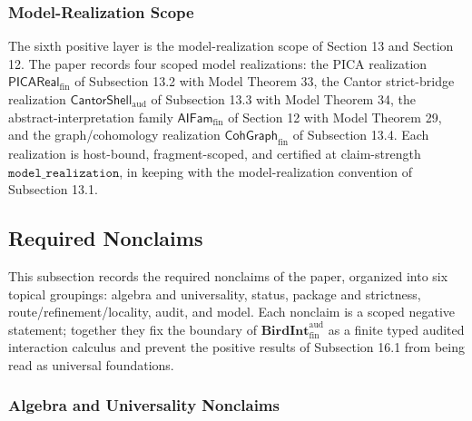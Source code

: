 \documentclass[11pt]{article}
\theoremstyle{definition}
\begin{document}
\subsubsection{Model-Realization Scope}

The sixth positive layer is the model-realization scope of Section 13 and Section 12. The paper records four scoped model realizations: the PICA realization \(\mathsf{PICAReal}_{\mathrm{fin}}\) of Subsection 13.2 with Model Theorem 33, the Cantor strict-bridge realization \(\mathsf{CantorShell}_{\mathrm{aud}}\) of Subsection 13.3 with Model Theorem 34, the abstract-interpretation family \(\mathsf{AIFam}_{\mathrm{fin}}\) of Section 12 with Model Theorem 29, and the graph/cohomology realization \(\mathsf{CohGraph}_{\mathrm{fin}}\) of Subsection 13.4. Each realization is host-bound, fragment-scoped, and certified at claim-strength \(\texttt{model\_realization}\), in keeping with the model-realization convention of Subsection 13.1.

\subsection{Required Nonclaims}

This subsection records the required nonclaims of the paper, organized into six topical groupings: algebra and universality, status, package and strictness, route/refinement/locality, audit, and model. Each nonclaim is a scoped negative statement; together they fix the boundary of \(\mathbf{BirdInt}^{\mathrm{aud}}_{\mathrm{fin}}\) as a finite typed audited interaction calculus and prevent the positive results of Subsection 16.1 from being read as universal foundations.

\subsubsection{Algebra and Universality Nonclaims}
\end{document}
